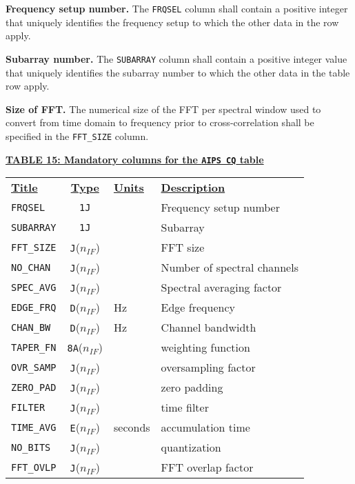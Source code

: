 \documentclass[twoside]{article}
\newcommand{\nif}{$n_{IF}$}
\begin{document}
{\bf Frequency setup number.} The {\tt FRQSEL} column shall contain a
positive integer that uniquely identifies the frequency setup to which
the other data in the row apply.

{\bf Subarray number.} The {\tt SUBARRAY} column shall contain a
positive integer value that uniquely identifies the subarray number
to which the other data in the table row apply.

{\bf Size of FFT.} The numerical size of the FFT per spectral window
used to convert from time domain to frequency prior to
cross-correlation shall be specified in the {\tt FFT\_SIZE} column.

\vfill\eject
\begin{center}
\underline{\bf{TABLE 15: Mandatory columns for the {\tt AIPS CQ} table}}\\
\begin{tabular}{lcll}
\noalign{\vspace{2pt}} \label{ta:CQcols}
\underline{{\bf Title\vphantom{y}}} & \underline{\bf{Type}} &
   \underline{{\bf Units\vphantom{y}}} & \underline{\bf{Description}} \\
\noalign{\vspace{2pt}}
{\tt FRQSEL}      & {\tt 1J}      &  & Frequency setup number \\
{\tt SUBARRAY}    & {\tt 1J}      &  & Subarray \\
{\tt FFT\_SIZE}   & {\tt J}(\nif) &  & FFT size \\
{\tt NO\_CHAN}    & {\tt J}(\nif) &  & Number of spectral channels \\
{\tt SPEC\_AVG}   & {\tt J}(\nif) &  & Spectral averaging factor \\
{\tt EDGE\_FRQ}   & {\tt D}(\nif) & Hz & Edge frequency \\
{\tt CHAN\_BW}    & {\tt D}(\nif) & Hz & Channel bandwidth \\
{\tt TAPER\_FN}   & {\tt 8A}(\nif) &  & weighting function \\
{\tt OVR\_SAMP}   & {\tt J}(\nif) &  & oversampling factor \\
{\tt ZERO\_PAD}   & {\tt J}(\nif) &  & zero padding \\
{\tt FILTER}      & {\tt J}(\nif) &  & time filter \\
{\tt TIME\_AVG}   & {\tt E}(\nif) & seconds & accumulation time \\
{\tt NO\_BITS}    & {\tt J}(\nif) &  & quantization \\
{\tt FFT\_OVLP}   & {\tt J}(\nif) &  & FFT overlap factor
\end{tabular}
\end{center}
\end{document}
